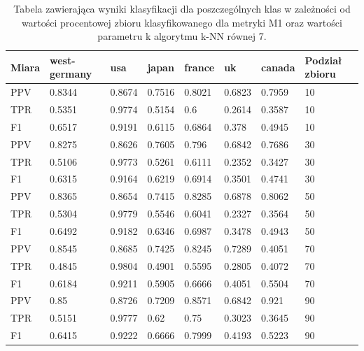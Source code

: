 \documentclass{classrep}
\begin{document}
\begin{table}[H]
    \centering
\caption{Tabela zawierająca wyniki klasyfikacji dla poszczególnych klas w zależności od wartości procentowej zbioru
klasyfikowanego dla metryki M1 oraz wartości parametru k algorytmu k-NN równej 7.}
\begin{adjustbox}{max width=\textwidth}
    \begin{tabular}{|l|l|l|l|l|l|l|l|}
    \hline
        Miara & west-germany  & usa  & japan & france & uk & canada & Podział zbioru \\ \hline
        PPV & 0.8344 & 0.8674 & 0.7516 & 0.8021 & 0.6823 & 0.7959 & 10 \\ \hline
        TPR & 0.5351 & 0.9774 & 0.5154 & 0.6 & 0.2614 & 0.3587 & 10 \\ \hline
        F1 & 0.6517 & 0.9191 & 0.6115 & 0.6864 & 0.378 & 0.4945 & 10 \\ \hline
        PPV & 0.8275 & 0.8626 & 0.7605 & 0.796 & 0.6842 & 0.7686 & 30 \\ \hline
        TPR & 0.5106 & 0.9773 & 0.5261 & 0.6111 & 0.2352 & 0.3427 & 30 \\ \hline
        F1 & 0.6315 & 0.9164 & 0.6219 & 0.6914 & 0.3501 & 0.4741 & 30 \\ \hline
        PPV & 0.8365 & 0.8654 & 0.7415 & 0.8285 & 0.6878 & 0.8062 & 50 \\ \hline
        TPR & 0.5304 & 0.9779 & 0.5546 & 0.6041 & 0.2327 & 0.3564 & 50 \\ \hline
        F1 & 0.6492 & 0.9182 & 0.6346 & 0.6987 & 0.3478 & 0.4943 & 50 \\ \hline
        PPV & 0.8545 & 0.8685 & 0.7425 & 0.8245 & 0.7289 & 0.4051 & 70 \\ \hline
        TPR & 0.4845 & 0.9804 & 0.4901 & 0.5595 & 0.2805 & 0.4072 & 70 \\ \hline
        F1 & 0.6184 & 0.9211 & 0.5905 & 0.6666 & 0.4051 & 0.5504 & 70 \\ \hline
        PPV & 0.85 & 0.8726 & 0.7209 & 0.8571 & 0.6842 & 0.921 & 90 \\ \hline
        TPR & 0.5151 & 0.9777 & 0.62 & 0.75 & 0.3023 & 0.3645 & 90 \\ \hline
        F1 & 0.6415 & 0.9222 & 0.6666 & 0.7999 & 0.4193 & 0.5223 & 90 \\ \hline
    \end{tabular}
\end{adjustbox}
\end{table}
\end{document}
